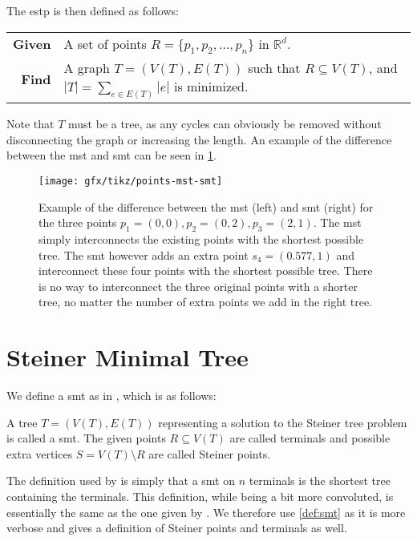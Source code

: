The \ac{estp} is then defined as follows:
%
\begin{center}
  \begin{tabular}{rp{9cm}}
    \toprule
    \textbf{Given} & A set of points $R = \{ p_1, p_2, \ldots, p_n \}$ in
                     $\mathbb{R}^d$. \\
    \textbf{Find} & A graph $T = (V(T), E(T))$ such that $R \subseteq V(T)$, and
                    $|T| = \sum_{e \in E(T)} |e|$ is minimized. \\
    \bottomrule
  \end{tabular}
\end{center}
%
Note that $T$ must be a tree, as any cycles can obviously be removed without
disconnecting the graph or increasing the length. An example of the difference
between the \ac{mst} and \ac{smt} can be seen in \cref{fig:points-mst-smt}.

\begin{figure}[htbp]
  \centering
  \texttt{[image: gfx/tikz/points-mst-smt]}
  \caption[\acs{mst} vs. \acs{smt}]{Example of the difference between the \acs{mst} (left)
    and \acs{smt} (right) for the three points $p_1 = (0,0), p_2 = (0, 2), p_3 = (2,
    1)$. The \acs{mst} simply interconnects the existing points with the shortest
    possible tree. The \acs{smt} however adds an extra point $s_4 = (0.577, 1)$
    and interconnect these four points with the shortest possible tree. There is
    no way to interconnect the three original points with a shorter tree, no
    matter the number of extra points we add in the right tree.\label{fig:points-mst-smt}}
\end{figure}

\section{Steiner Minimal Tree}
\label{sec:steiner-minimal-tree}

We define a \ac{smt} as in \textcite{brazil2015}, which is as follows:
%
\begin{definition}
  A tree $T = (V(T), E(T))$ representing a solution to the Steiner tree problem
  is called a \acl{smt}. The given points $R \subseteq V(T)$ are called
  terminals and possible extra vertices $S = V(T) \setminus R$ are called
  Steiner points.\label{def:smt}
\end{definition}
%
The definition used by \textcite{smith1992} is simply that a \ac{smt} on $n$
terminals is the shortest tree containing the terminals. This definition, while being
a bit more convoluted, is essentially the same as the one given by
\textcite{brazil2015}. We therefore use \cref{def:smt} as it is more verbose and
gives a definition of Steiner points and terminals as well.

